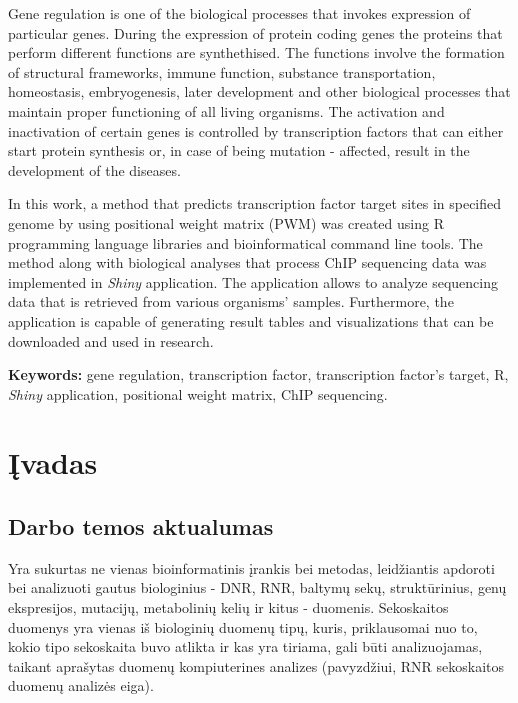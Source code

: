 \documentclass[12pt]{article}
\begin{document}
Gene regulation is one of the biological processes that invokes expression of
particular genes. During the expression of protein coding genes the proteins
that perform different functions are synthethised. The functions involve the
formation of structural frameworks, immune function, substance transportation,
homeostasis, embryogenesis, later development and other biological processes
that maintain proper functioning of all living organisms. The activation and
inactivation of certain genes is controlled by transcription factors that can
either start protein synthesis or, in case of being mutation - affected,
result in the development of the diseases.

In this work, a method that predicts transcription factor target sites in
specified genome by using positional weight matrix (PWM) was created using R
programming language libraries and bioinformatical command line tools. The
method along with biological analyses that process ChIP sequencing data was
implemented in \emph{Shiny} application. The application allows to analyze
sequencing data that is retrieved from various organisms' samples. Furthermore,
the application is capable of generating result tables and visualizations that
can be downloaded and used in research.

\hfill \break
\textbf{Keywords:} gene regulation, transcription factor, transcription factor's
target, R, \emph{Shiny} application, positional weight matrix, ChIP
sequencing.

\newpage


\section{Įvadas}
\subsection*{Darbo temos aktualumas}
Yra sukurtas ne vienas bioinformatinis įrankis\cite{BIOTOOLS} bei metodas,
leidžiantis apdoroti bei analizuoti gautus biologinius - DNR, RNR, baltymų sekų,
struktūrinius, genų ekspresijos, mutacijų, metabolinių kelių ir kitus -
duomenis. Sekoskaitos duomenys yra vienas iš biologinių duomenų tipų, kuris,
priklausomai nuo to, kokio tipo sekoskaita buvo atlikta ir kas yra tiriama, gali
būti analizuojamas, taikant aprašytas duomenų kompiuterines analizes
(pavyzdžiui, RNR sekoskaitos duomenų analizės eiga\cite{RNASEQ}).
\end{document}
